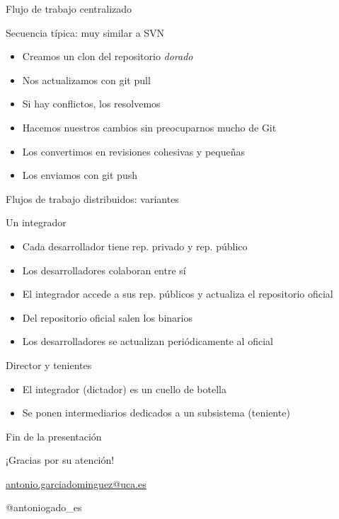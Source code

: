 \documentclass[xcolor=svgnames]{beamer}
\newcommand*{\inlinecmd}[1]{{\small\ttfamily\nohyphens{#1}}}
\begin{document}
\begin{frame}{Flujo de trabajo centralizado}

  \begin{block}{Secuencia típica: muy similar a SVN}
    \begin{itemize}
    \item Creamos un clon del repositorio \emph{dorado}
    \item Nos actualizamos con \inlinecmd{git pull}
    \item Si hay conflictos, los resolvemos
    \item Hacemos nuestros cambios sin preocuparnos mucho de Git
    \item Los convertimos en revisiones cohesivas y pequeñas
    \item Los enviamos con \inlinecmd{git push}
    \end{itemize}
  \end{block}

\end{frame}

\begin{frame}{Flujos de trabajo distribuidos: variantes}

  \begin{block}{Un integrador}
    \begin{itemize}
    \item Cada desarrollador tiene rep. privado y rep. público
    \item Los desarrolladores colaboran entre sí
    \item El integrador accede a sus rep. públicos y actualiza el
      repositorio oficial
    \item Del repositorio oficial salen los binarios
    \item Los desarrolladores se actualizan periódicamente al oficial
    \end{itemize}
  \end{block}

  \begin{block}{Director y tenientes}
    \begin{itemize}
    \item El integrador (dictador) es un cuello de botella
    \item Se ponen intermediarios dedicados a un subsistema (teniente)
    \end{itemize}
  \end{block}

\end{frame}

\appendix

\begin{frame}{Fin de la presentación}
  \begin{center}
    {\Huge ¡Gracias por su atención!}

    \vspace{3em}

    {
      \Large
      \href{mailto:antonio.garciadominguez@uca.es}{antonio.garciadominguez@uca.es}

      \vspace{1em}

      @antoniogado\_es
    }
  \end{center}
\end{frame}
\end{document}
